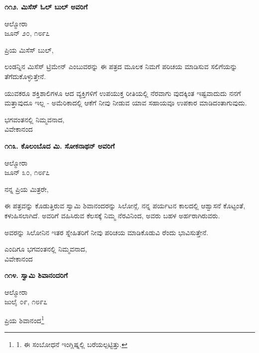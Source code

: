 \begin{center}
\textbf{೧೧೨. ಮಿಸೆಸ್ ಓಲ್ ಬುಲ್ ಅವರಿಗೆ}
\end{center}

\begin{flushright}
ಆಲ್ಮೋರಾ\\ಜೂನ್ ೨೦, ೧೮೯೭
\end{flushright}

ಪ್ರಿಯ ಮಿಸೆಸ್ ಬುಲ್,

ಲಂಡನ್ನಿನ ಮಿಸೆಸ್ ಟ್ರಿಮೇನ್ ಎಂಬುವರನ್ನು ಈ ಪತ್ರದ ಮೂಲಕ ನಿಮಗೆ ಪರಿಚಯ ಮಾಡಿಸುವ ಸಲಿಗೆಯನ್ನು ತೆಗೆದುಕೊಳ್ಳುತ್ತೇನೆ.

ಯುವಕರೂ ಶಕ್ತಿಶಾಲಿಗಳೂ ಆದ ವ್ಯಕ್ತಿಗಳಿಗೆ ಉಪಯುಕ್ತ ರೀತಿಯಲ್ಲಿ ನೆರವಾಗು ವುದಕ್ಕಿಂತ ಇಷ್ಟವಾದುದು ನನಗೆ ಮತ್ತಾವುದೂ ಇಲ್ಲ - ಅಮೆರಿಕಾದಲ್ಲಿ ಆಕೆಗೆ ನೀವು ನೀಡುವ ಯಾವ ಸಹಾಯವೂ ಉಪಕಾರ ಮಾಡಿದಂತಾಗುವುದು.

\begin{flushright}
ಭಗವಂತನಲ್ಲಿ ನಿಮ್ಮವನಾದ,\\ವಿವೇಕಾನಂದ
\end{flushright}

\begin{center}
\textbf{೧೧೩. ಕೊಲಂಬೊದ ಮಿ. ಸೋಕನಾಥನ್ ಅವರಿಗೆ}
\end{center}

\begin{flushright}
ಆಲ್ಮೋರಾ\\ಜೂನ್ ೩೦, ೧೮೯೭
\end{flushright}

ನನ್ನ ಪ್ರಿಯ ಮಿತ್ರರೇ,

ಈ ಪತ್ರವನ್ನು ಕೊಡುತ್ತಿರುವ ಸ್ವಾಮಿ ಶಿವಾನಂದರನ್ನು ಸಿಲೋನ್ಗೆ, ನನ್ನ ಪರ್ಯಟನ ಕಾಲದಲ್ಲಿ ಆಶ್ವಾಸನೆ ಕೊಟ್ಟಂತೆ, ಕಳುಹಿಸಲಾಗಿದೆ. ಅವರಿಗೆ ವಹಿಸಿರುವ ಕೆಲಸಕ್ಕೆ ನಿಮ್ಮ ನೆರವಿನಿಂದ, ಅವರು ಬಹಳ ಅರ್ಹರಾಗಿರುವರು.

ಅವರನ್ನು ಸಿಲೋನಿನ ಇತರ ಸ್ನೇಹಿತರಿಗೆ ನೀವು ಪರಿಚಯ ಮಾಡಿಕೊಡುವಿ ರೆಂದು ಭಾವಿಸುತ್ತೇನೆ.

\begin{flushright}
ಎಂದಿಗೂ ಭಗವಂತನಲ್ಲಿ ನಿಮ್ಮವನಾದ,\\ವಿವೇಕಾನಂದ
\end{flushright}

\begin{center}
\textbf{೧೧೪. ಸ್ವಾಮಿ ಶಿವಾನಂದರಿಗೆ}
\end{center}

\begin{flushright}
ಆಲ್ಮೋರಾ\\ಜುಲೈ ೦೯, ೧೮೯೭
\end{flushright}

ಪ್ರಿಯ ಶಿವಾನಂದ\footnote{1. ಈ ಸಂಬೋಧನೆ ಇಂಗ್ಲಿಷ್ನಲ್ಲಿ ಬರೆಯಲ್ಪಟ್ಟಿತ್ತು.}

